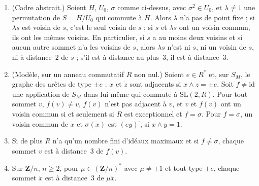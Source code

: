 \begin{encadre}
\begin{theoreme}\leavevmode
\begin{enumerate}
\item (Cadre abstrait.) Soient $H$, $U_0$, $\sigma$ comme ci-dessus, avec $\sigma^2 \in U_0$, et $\lambda \neq 1$ une permutation de $S = H/U_0$ qui commute à $H$. Alors $\lambda$ n'a pas de point fixe ; si $\lambda s$ est voisin de $s$, c'est le seul voisin de $s$ ; si $s$ et $\lambda s$ ont un voisin commun, ils ont les mêmes voisins. En particulier, si $s$ a au moins deux voisins et si aucun autre sommet n'a les voisins de $s$, alors $\lambda s$ n'est ni $s$, ni un voisin de $s$, ni à distance~$2$ de $s$ ; s'il est à distance au plus~$3$, il est à distance~$3$.
\item (Modèle, sur un anneau commutatif $R$ non nul.) Soient $e \in R^*$ et, sur $S_M$, le graphe des arêtes de type $\pm e$ : $\dot x$ et $\dot z$ sont adjacents si $x \wedge z = \pm e$. Soit $f \neq \mathrm{id}$ une application de $S_M$ dans lui-même qui commute à $\mathrm{SL}(2, R)$. Pour tout sommet $v$, $f(v) \neq v$, $f(v)$ n'est pas adjacent à $v$, et $v$ et $f(v)$ ont un voisin commun si et seulement si $R$ est exceptionnel et $f = \sigma$. Pour $f = \sigma$, un voisin commun de $\dot x$ et $\sigma(\dot x)$ est $(ey)^{\cdot}$, si $x \wedge y = 1$.
\item Si de plus $R$ n'a qu'un nombre fini d'idéaux maximaux et si $f \neq \sigma$, chaque sommet $v$ est à distance~$3$ de $f(v)$.
\item Sur $\mathbf Z/n$, $n \geq 2$, pour $\mu \in (\mathbf Z/n)^*$ avec $\mu \neq \pm 1$ et tout type $\pm e$, chaque sommet $\dot x$ est à distance~$3$ de $\mu\dot x$.
\end{enumerate}
\end{theoreme}
\end{encadre}

